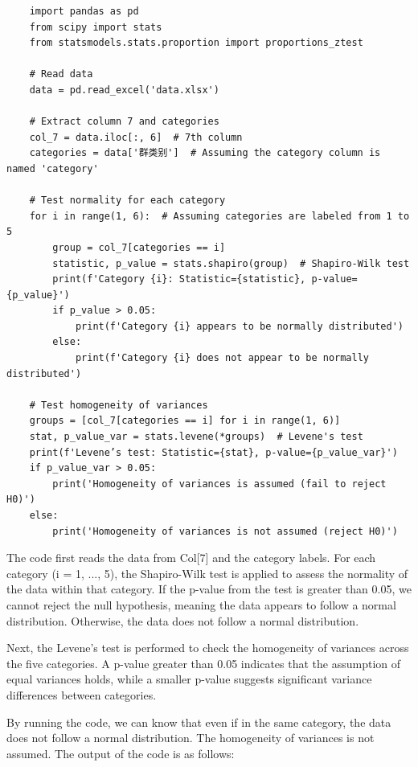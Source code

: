 \documentclass[12pt]{article}
\begin{document}
\begin{verbatim}
    import pandas as pd
    from scipy import stats
    from statsmodels.stats.proportion import proportions_ztest

    # Read data
    data = pd.read_excel('data.xlsx')

    # Extract column 7 and categories
    col_7 = data.iloc[:, 6]  # 7th column
    categories = data['群类别']  # Assuming the category column is named 'category'

    # Test normality for each category
    for i in range(1, 6):  # Assuming categories are labeled from 1 to 5
        group = col_7[categories == i]
        statistic, p_value = stats.shapiro(group)  # Shapiro-Wilk test
        print(f'Category {i}: Statistic={statistic}, p-value={p_value}')
        if p_value > 0.05:
            print(f'Category {i} appears to be normally distributed')
        else:
            print(f'Category {i} does not appear to be normally distributed')

    # Test homogeneity of variances
    groups = [col_7[categories == i] for i in range(1, 6)]
    stat, p_value_var = stats.levene(*groups)  # Levene's test
    print(f'Levene’s test: Statistic={stat}, p-value={p_value_var}')
    if p_value_var > 0.05:
        print('Homogeneity of variances is assumed (fail to reject H0)')
    else:
        print('Homogeneity of variances is not assumed (reject H0)')

\end{verbatim}

The code first reads the data from Col[7] and the category labels. For each category (i = 1, ..., 5), the Shapiro-Wilk test is applied to assess the normality of the data within that category. If the p-value from the test is greater than 0.05, we cannot reject the null hypothesis, meaning the data appears to follow a normal distribution. Otherwise, the data does not follow a normal distribution.

Next, the Levene's test is performed to check the homogeneity of variances across the five categories. A p-value greater than 0.05 indicates that the assumption of equal variances holds, while a smaller p-value suggests significant variance differences between categories.

By running the code, we can know that even if in the same category, the data does not follow a normal distribution. The homogeneity of variances is not assumed. The output of the code is as follows:
\end{document}
